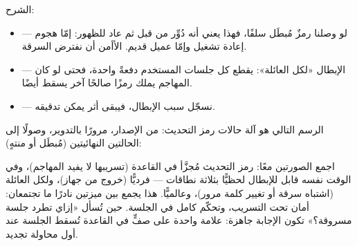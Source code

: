 الشرح:
\begin{itemize}
\item {} — لو وصلنا رمزٌ مُبطَل سلفًا، فهذا يعني أنه دُوِّر
  من قبل ثم عاد للظهور: إمّا هجوم إعادة تشغيل وإمّا عميل قديم. الأأمن أن نفترض السرقة.
\item {} — الإبطال «لكل العائلة»: يقطع كل جلسات
  المستخدم دفعةً واحدة، فحتى لو كان المهاجم يملك رمزًا صالحًا آخر يسقط أيضًا.
\item {} — نسجّل سبب الإبطال، فيبقى أثر يمكن تدقيقه.
\end{itemize}

الرسم التالي هو آلة حالات رمز التحديث: من الإصدار، مرورًا بالتدوير، وصولًا إلى
الحالتين النهائيتين (مُبطَل أو منتهٍ):

\begin{center}\begin{LTR}
\end{LTR}\end{center}

\begin{spotlight}
اجمع الصورتين معًا: رمز التحديث مُجزَّأ في القاعدة (تسريبها لا يفيد المهاجم)، وفي
الوقت نفسه قابل للإبطال لحظيًّا بثلاثة نطاقات — فرديًّا (خروج من جهاز)، ولكل العائلة
(اشتباه سرقة أو تغيير كلمة مرور)، وعالميًّا. هذا يجمع بين ميزتين نادرًا ما تجتمعان:
أمان تحت التسريب، وتحكّم كامل في الجلسة. حين تُسأل «إزاي تطرد جلسة مسروقة؟» تكون
الإجابة جاهزة: علامة واحدة على صفٍّ في القاعدة تُسقط الجلسة عند أول محاولة تجديد.
\end{spotlight}

